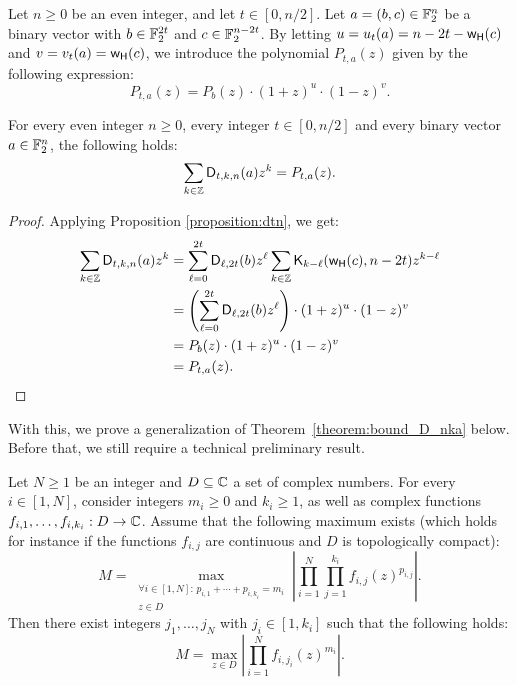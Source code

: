 \documentclass{llncs}
\begin{document}
\begin{definition}\label{defi:P_a_t}
    Let $n\geq 0$ be an even integer, and let $t\in[0,n/2]$. Let $a=(b,c)\in\mathbb{F}_2^n$ be a binary vector with $b\in\mathbb{F}_2^{2t}$ and $c\in\mathbb{F}_2^{n-2t}$. By letting $u=u_t(a)=n-2t-\mathsf{w_H}(c)$ and $v=v_t(a)=\mathsf{w_H}(c)$, we introduce the polynomial $P_{t,a}(z)$ given by the following expression:
    \[
        P_{t,a}(z)=P_b(z)\cdot(1+z)^u\cdot(1-z)^v.
    \]
\end{definition}

\begin{proposition}
    For every even integer $n\geq 0$, every integer $t\in[0,n/2]$ and every binary vector $a\in\mathbb{F}_2^n$, the following holds:
    \[
        \sum_{k\in\mathbb{Z}}\mathsf{D}_{t,k,n}(a)z^k=P_{t,a}(z).
    \]
\end{proposition}

\begin{proof}
    Applying Proposition \ref{proposition:dtn}, we get:
    \begin{align*}
        \sum_{k\in\mathbb{Z}}\mathsf{D}_{t,k,n}(a)z^k&=\sum_{\ell=0}^{2t}\mathsf{D}_{\ell,2t}(b)z^\ell\sum_{k\in\mathbb{Z}}\mathsf{K}_{k-\ell}(\mathsf{w_H}(c),n-2t)z^{k-\ell}\\
        &=\left(\sum_{\ell=0}^{2t}\mathsf{D}_{\ell,2t}(b)z^\ell\right)\cdot(1+z)^u\cdot(1-z)^v\\
        &=P_b(z)\cdot(1+z)^u\cdot(1-z)^v\\
        &=P_{t,a}(z).\qedhere
    \end{align*}
\end{proof}

With this, we prove a generalization of Theorem~\ref{theorem:bound_D_nka} below. Before that, we still require a technical preliminary result.

\begin{lemma}\label{lemma:maximizing_args}
    Let $N\geq 1$ be an integer and $D\subseteq\mathbb{C}$ a set of complex numbers. For every $i\in[1,N]$, consider integers $m_i\geq 0$ and $k_i\geq 1$, as well as complex functions $f_{i,1},\dots,f_{i,k_i}:D\to\mathbb{C}$. Assume that the following maximum exists (which holds for instance if the functions $f_{i,j}$ are continuous and $D$ is topologically compact):
    \[
        M=\max_{\substack{\forall i\in[1,N]:\,p_{i,1}+\cdots+p_{i,k_i}=m_i\\z\in D}}\left|\prod_{i=1}^N\prod_{j=1}^{k_i}f_{i,j}(z)^{p_{i,j}}\right|.
    \]
    Then there exist integers $j_1,\dots,j_N$ with $j_i\in[1,k_i]$ such that the following holds:
    \[
        M=\max_{z\in D}\left|\prod_{i=1}^Nf_{i,j_i}(z)^{m_i}\right|.
    \]
\end{lemma}
\end{document}
